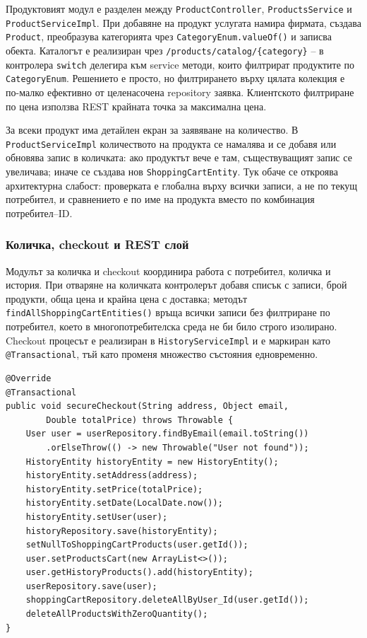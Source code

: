 Продуктовият модул е разделен между \texttt{ProductController}, \texttt{ProductsService} и \texttt{ProductServiceImpl}. При добавяне на продукт услугата намира фирмата, създава \texttt{Product}, преобразува категорията чрез \texttt{CategoryEnum.valueOf()} и записва обекта. Каталогът е реализиран чрез \texttt{/products/catalog/\{category\}} -- в контролера \texttt{switch} делегира към service методи, които филтрират продуктите по \texttt{CategoryEnum}. Решението е просто, но филтрирането върху цялата колекция е по-малко ефективно от целенасочена repository заявка. Клиентското филтриране по цена използва REST крайната точка за максимална цена.

За всеки продукт има детайлен екран за заявяване на количество. В \texttt{ProductServiceImpl} количеството на продукта се намалява и се добавя или обновява запис в количката: ако продуктът вече е там, съществуващият запис се увеличава; иначе се създава нов \texttt{ShoppingCartEntity}. Тук обаче се откроява архитектурна слабост: проверката е глобална върху всички записи, а не по текущ потребител, и сравнението е по име на продукта вместо по комбинация потребител--ID.

\subsubsection{Количка, checkout и REST слой}

Модулът за количка и checkout координира работа с потребител, количка и история. При отваряне на количката контролерът добавя списък с записи, брой продукти, обща цена и крайна цена с доставка; методът \texttt{findAllShoppingCartEntities()} връща всички записи без филтриране по потребител, което в многопотребителска среда не би било строго изолирано. Checkout процесът е реализиран в \texttt{HistoryServiceImpl} и е маркиран като \texttt{@Transactional}, тъй като променя множество състояния едновременно.

\noindent\begin{minipage}{\linewidth}
\begin{lstlisting}[caption={Същност на checkout операцията},label={lst:checkout-service}]
@Override
@Transactional
public void secureCheckout(String address, Object email,
        Double totalPrice) throws Throwable {
    User user = userRepository.findByEmail(email.toString())
        .orElseThrow(() -> new Throwable("User not found"));
    HistoryEntity historyEntity = new HistoryEntity();
    historyEntity.setAddress(address);
    historyEntity.setPrice(totalPrice);
    historyEntity.setDate(LocalDate.now());
    historyEntity.setUser(user);
    historyRepository.save(historyEntity);
    setNullToShoppingCartProducts(user.getId());
    user.setProductsCart(new ArrayList<>());
    user.getHistoryProducts().add(historyEntity);
    userRepository.save(user);
    shoppingCartRepository.deleteAllByUser_Id(user.getId());
    deleteAllProductsWithZeroQuantity();
}
\end{lstlisting}
\end{minipage}

